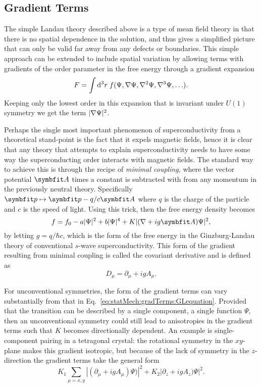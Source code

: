 \subsection{Gradient Terms}

The simple Landau theory described above is a type of mean field theory in that there is no spatial dependence in the
solution, and thus gives a simplified picture that can only be valid far away from any defects or boundaries. This simple approach
can be extended to include spatial variation by allowing terms with gradients of the order parameter in the free energy through
a gradient expansion
\begin{equation}
    \label{eq:statMech:gradTerms:gradExpansion}
    F = \int\mathop{\textrm{d}\kern0em^3r\kern0.1em}f(\Psi, \nabla\Psi, \nabla^2\Psi, \nabla^3\Psi, \ldots).
\end{equation}
Keeping only the lowest order in this expansion that is invariant under $U(1)$ symmetry we get the term
$\lvert \nabla\Psi \rvert^2$.

Perhaps the single most important phenomenon of superconductivity from a theoretical stand-point is the fact that it expels
magnetic fields, hence it is clear that any theory that attempts to explain superconductivity needs to have some way the
superconducting order interacts with magnetic fields. The standard way to achieve this is through the recipe of
\emph{minimal coupling}, where the vector potential $\v{A}$ times a constant is subtracted with from any momentum
in the previously neutral theory. Specifically $\v{p}\mapsto \v{p}-q/c\v{A}$ where $q$ is the charge of the particle and
$c$ is the speed of light. Using this trick, then the free energy density becomes
\begin{equation}
    \label{eq:statMech:gradTerms:GLequation}
    f = f_0 - a\abs{\Psi}^2 + b\abs{\Psi}^4 + K\abs{(\nabla+ig\v{A})\Psi}^2,
\end{equation}
by letting $g=q/\hbar c$, which is the form of the free energy in the Ginzburg-Landau theory of conventional $s$-wave superconductivity.
This form of the gradient resulting from minimal coupling is called the covariant derivative and is defined as 
\begin{equation}
    \label{eq:statMech:gradTerms:covariantGradient}
    D_\mu = \partial_\mu + igA_\mu.
\end{equation}

For unconventional symmetries, the form of the gradient terms can vary substantially from that in
Eq.~\eqref{eq:statMech:gradTerms:GLequation}. Provided that the transition can be described by a single component, \ie a
single function $\Psi$, then an unconventional symmetry could still lead to anisotropies in the gradient terms such that
$K$ becomes directionally dependent. An example is single-component pairing in a tetragonal crystal: the rotational symmetry
in the $xy$-plane makes this gradient isotropic, but because of the lack of symmetry in the $z$-direction the gradient
terms take the general form
\begin{equation}
    \label{eq:statMech:gradTerms:tetragonal}
    K_1\sum_{\mu=x,y}|(\partial_\mu+igA_\mu)\Psi)|^2 + K_2|\partial_z+igA_z)\Psi|^2.
\end{equation}

